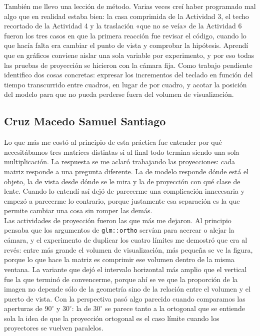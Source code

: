     También me llevo una lección de método. Varias veces creí haber programado mal algo que en realidad estaba bien: la casa comprimida de la Actividad 3, el techo recortado de la Actividad 4 y la traslación «que no se veía» de la Actividad 6 fueron los tres casos en que la primera reacción fue revisar el código, cuando lo que hacía falta era cambiar el punto de vista y comprobar la hipótesis. Aprendí que en gráficos conviene aislar una sola variable por experimento, y por eso todas las pruebas de proyección se hicieron con la cámara fija. Como trabajo pendiente identifico dos cosas concretas: expresar los incrementos del teclado en función del tiempo transcurrido entre cuadros, en lugar de por cuadro, y acotar la posición del modelo para que no pueda perderse fuera del volumen de visualización.\\

    \subsection{Cruz Macedo Samuel Santiago}

    Lo que más me costó al principio de esta práctica fue entender por qué necesitábamos tres matrices distintas si al final todo termina siendo una sola multiplicación. La respuesta se me aclaró trabajando las proyecciones: cada matriz responde a una pregunta diferente. La de modelo responde dónde está el objeto, la de vista desde dónde se le mira y la de proyección con qué clase de lente. Cuando lo entendí así dejó de parecerme una complicación innecesaria y empezó a parecerme lo contrario, porque justamente esa separación es la que permite cambiar una cosa sin romper las demás.\\

    Las actividades de proyección fueron las que más me dejaron. Al principio pensaba que los argumentos de \texttt{glm::ortho} servían para acercar o alejar la cámara, y el experimento de duplicar los cuatro límites me demostró que era al revés: entre más grande el volumen de visualización, más pequeña se ve la figura, porque lo que hace la matriz es comprimir ese volumen dentro de la misma ventana. La variante que dejó el intervalo horizontal más amplio que el vertical fue la que terminó de convencerme, porque ahí se ve que la proporción de la imagen no depende sólo de la geometría sino de la relación entre el volumen y el puerto de vista. Con la perspectiva pasó algo parecido cuando comparamos las aperturas de $90^\circ$ y $30^\circ$: la de $30^\circ$ se parece tanto a la ortogonal que se entiende sola la idea de que la proyección ortogonal es el caso límite cuando los proyectores se vuelven paralelos.\\

